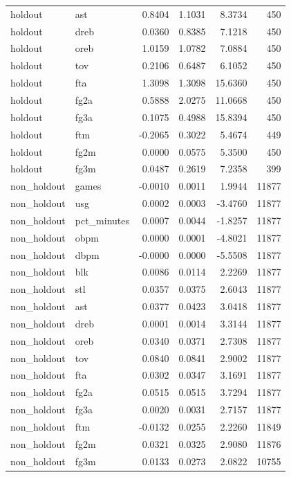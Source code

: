 \begin{table}
\begin{tabular}{llrrrr}
holdout & ast & 0.8404 & 1.1031 & 8.3734 & 450 \\
holdout & dreb & 0.0360 & 0.8385 & 7.1218 & 450 \\
holdout & oreb & 1.0159 & 1.0782 & 7.0884 & 450 \\
holdout & tov & 0.2106 & 0.6487 & 6.1052 & 450 \\
holdout & fta & 1.3098 & 1.3098 & 15.6360 & 450 \\
holdout & fg2a & 0.5888 & 2.0275 & 11.0668 & 450 \\
holdout & fg3a & 0.1075 & 0.4988 & 15.8394 & 450 \\
holdout & ftm & -0.2065 & 0.3022 & 5.4674 & 449 \\
holdout & fg2m & 0.0000 & 0.0575 & 5.3500 & 450 \\
holdout & fg3m & 0.0487 & 0.2619 & 7.2358 & 399 \\
non\_holdout & games & -0.0010 & 0.0011 & 1.9944 & 11877 \\
non\_holdout & usg & 0.0002 & 0.0003 & -3.4760 & 11877 \\
non\_holdout & pct\_minutes & 0.0007 & 0.0044 & -1.8257 & 11877 \\
non\_holdout & obpm & 0.0000 & 0.0001 & -4.8021 & 11877 \\
non\_holdout & dbpm & -0.0000 & 0.0000 & -5.5508 & 11877 \\
non\_holdout & blk & 0.0086 & 0.0114 & 2.2269 & 11877 \\
non\_holdout & stl & 0.0357 & 0.0375 & 2.6043 & 11877 \\
non\_holdout & ast & 0.0377 & 0.0423 & 3.0418 & 11877 \\
non\_holdout & dreb & 0.0001 & 0.0014 & 3.3144 & 11877 \\
non\_holdout & oreb & 0.0340 & 0.0371 & 2.7308 & 11877 \\
non\_holdout & tov & 0.0840 & 0.0841 & 2.9002 & 11877 \\
non\_holdout & fta & 0.0302 & 0.0347 & 3.1691 & 11877 \\
non\_holdout & fg2a & 0.0515 & 0.0515 & 3.7294 & 11877 \\
non\_holdout & fg3a & 0.0020 & 0.0031 & 2.7157 & 11877 \\
non\_holdout & ftm & -0.0132 & 0.0255 & 2.2260 & 11849 \\
non\_holdout & fg2m & 0.0321 & 0.0325 & 2.9080 & 11876 \\
non\_holdout & fg3m & 0.0133 & 0.0273 & 2.0822 & 10755 \\
\bottomrule
\end{tabular}
\end{table}

